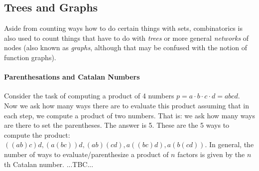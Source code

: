 





\subsection{Trees and Graphs}
Aside from counting ways how to do certain things with sets, combinatorics is also used to count things that have to do with \emph{trees} or more general \emph{networks} of nodes (also known as \emph{graphs}, although that may be confused with the notion of function graphs).



\paragraph{Parenthesations and Catalan Numbers}
Consider the task of computing a product of 4 numbers $p = a \cdot b \cdot c  \cdot d = abcd$. Now we ask how many ways there are to evaluate this product assuming that in each step, we compute a product of two numbers. That is: we ask how many ways are there to set the parentheses. The answer is 5. These are the 5 ways to compute the product: $((ab)c)d, (a(bc))d, (ab)(cd), a((bc)d), a(b(cd))$. In general, the number of ways to evaluate/parenthesize a product of $n$ factors is given by the $n$th Catalan number. ...TBC...






